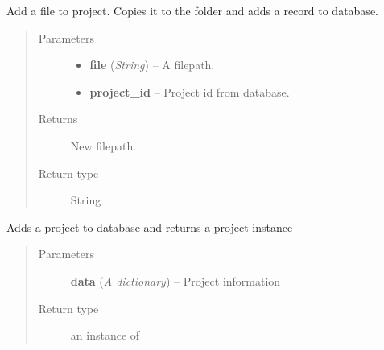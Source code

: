 \documentclass[letterpaper,10pt,english]{sphinxmanual}
\begin{document}

\begin{fulllineitems}
\label{api:controller.AddFileToProject}
Add a file to project. Copies it to the folder and adds a record to
database.
\begin{quote}\begin{description}
\item[{Parameters}] \leavevmode\begin{itemize}
\item {} 
\textbf{file} (\emph{String}) -- A filepath.

\item {} 
\textbf{project\_id} -- Project id from database.

\end{itemize}

\item[{Returns}] \leavevmode
New filepath.

\item[{Return type}] \leavevmode
String

\end{description}\end{quote}

\end{fulllineitems}


\begin{fulllineitems}
\label{api:controller.AddProject}
Adds a project to database and returns a  project instance
\begin{quote}\begin{description}
\item[{Parameters}] \leavevmode
\textbf{data} (\emph{A dictionary}) -- Project information

\item[{Return type}] \leavevmode
an instance of {\hyperref[api:models.Project]{}}

\end{description}\end{quote}

\end{fulllineitems}

\end{document}
